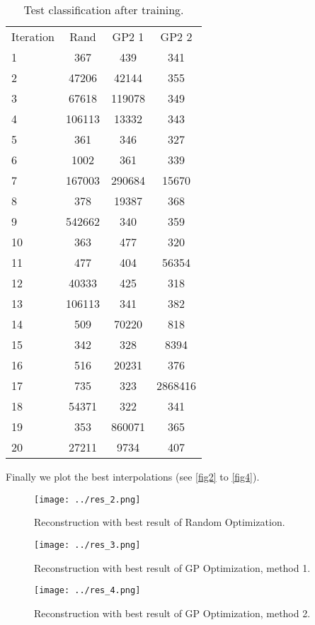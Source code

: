 \documentclass{article}
\begin{document}
\begin{table}[h]
	\centering
	\begin{tabular}{l c c c}
        Iteration&	Rand	& GP2 1    & GP2 2    \\
           1     &   367    &439	   & 341      \\
           2     &   47206  &42144	   & 355      \\
           3     &   67618  &119078	   & 349      \\
           4     &   106113 &13332     & 343      \\
           5     &   361    &346       & 327      \\
           6     &   1002   &361       & 339      \\
           7     &   167003 &290684    & 15670    \\
           8     &   378    &19387     & 368      \\
           9     &   542662 &340       & 359      \\
          10     &   363    &477       & 320      \\
          11     &   477    &404       & 56354    \\
          12     &   40333  &425       & 318      \\
          13     &   106113 &341       & 382      \\
          14     &   509    &70220     & 818      \\
          15     &   342    &328       & 8394     \\
          16     &   516    &20231     & 376      \\
          17     &   735    &323       & 2868416  \\
          18     &   54371  &322       & 341      \\
          19     &   353    &860071    & 365      \\
          20     &   27211  &9734      & 407      \\
	\end{tabular}   
	\caption{Test classification after training.}
	\label{tab2}
\end{table}

Finally we plot the best interpolations (see \autoref{fig2} to \autoref{fig4}).

\begin{figure}[h]
	\centering
	\texttt{[image: ../res\_2.png]}
	\caption{Reconstruction with best result of Random Optimization.}
	\label{fig2}
\end{figure}

\begin{figure}[h]
	\centering
	\texttt{[image: ../res\_3.png]}
	\caption{Reconstruction with best result of GP Optimization, method 1.}
	\label{fig3}
\end{figure}

\begin{figure}[h]
	\centering
	\texttt{[image: ../res\_4.png]}
	\caption{Reconstruction with best result of GP Optimization, method 2.}
	\label{fig4}
\end{figure}
\end{document}
